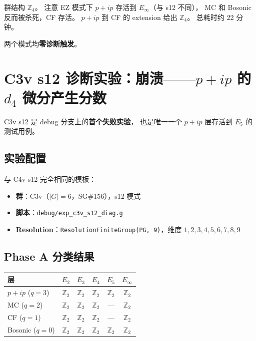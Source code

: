 \documentclass[a4paper,fontset=ubuntu,12pt]{ctexart}
\begin{document}
群结构 $\mathbb{Z}_4$。
注意 EZ 模式下 $p{+}ip$ 存活到 $E_\infty$（与 s12 不同），
MC 和 Bosonic 反而被杀死，CF 存活。
$p{+}ip$ 到 CF 的 extension 给出 $\mathbb{Z}_4$。
总耗时约 22 分钟。

两个模式均\textbf{零诊断触发}。

\section{C3v s12 诊断实验：崩溃——$p{+}ip$ 的 $d_4$ 微分产生分数}
\label{sec:c3v-s12-failure}

C3v s12 是 debug 分支上的\textbf{首个失败实验}，
也是唯一一个 $p{+}ip$ 层存活到 $E_5$ 的测试用例。

\subsection{实验配置}

与 C4v s12 完全相同的模板：
\begin{itemize}
\item \textbf{群}：C3v（$|G|=6$，SG\#156），s12 模式
\item \textbf{脚本}：\texttt{debug/exp\_c3v\_s12\_diag.g}
\item \textbf{Resolution}：\texttt{ResolutionFiniteGroup(PG, 9)}，维度 $1,2,3,4,5,6,7,8,9$
\end{itemize}

\subsection{Phase A 分类结果}

\begin{center}
\begin{tabular}{l|cccc|c}
\hline
层 & $E_2$ & $E_3$ & $E_4$ & $E_5$ & $E_\infty$ \\
\hline
$p{+}ip$ ($q=3$) & $\mathbb{Z}_2$ & $\mathbb{Z}_2$ & $\mathbb{Z}_2$
      & $\mathbb{Z}_2$ & $\mathbb{Z}_2$ \\
MC ($q=2$) & $\mathbb{Z}_2$ & $\mathbb{Z}_2$ & $\mathbb{Z}_2$ & --- & $\mathbb{Z}_2$ \\
CF ($q=1$) & $\mathbb{Z}_2$ & $\mathbb{Z}_2$ & $\mathbb{Z}_2$ & --- & $\mathbb{Z}_2$ \\
Bosonic ($q=0$) & $\mathbb{Z}_2$ & $\mathbb{Z}_2$ & $\mathbb{Z}_2$
      & $\mathbb{Z}_2$ & $\mathbb{Z}_2$ \\
\hline
\end{tabular}
\end{center}
\end{document}
